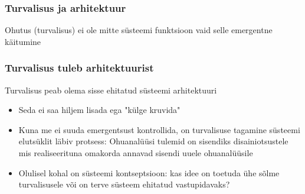 \begin{frame}[fragile]
  \frametitle{Turvalisus ja arhitektuur}
	\begin{center}
		Ohutus (turvalisus) ei ole mitte süsteemi funktsioon vaid selle emergentne käitumine
	\end{center}
	\cite{leveson2011engineering}
\end{frame}

\begin{frame}[fragile]
  \frametitle{Turvalisus tuleb arhitektuurist}
	Turvalisus peab olema sisse ehitatud süsteemi arhitektuuri
	\begin{itemize}
		\item Seda ei saa hiljem lisada ega "külge kruvida"
		\item Kuna me ei suuda emergentsust kontrollida, on turvalisuse tagamine süsteemi elutsüklit läbiv protsess: Ohuanalüüsi tulemid on sisendiks disainiotsustele mis realiseerituna omakorda annavad sisendi uuele ohuanalüüsile
		\item Olulisel kohal on süsteemi kontseptsioon: kas idee on toetuda ühe sõlme turvalisusele või on terve süsteem ehitatud vastupidavaks?
	\end{itemize}
\end{frame}

